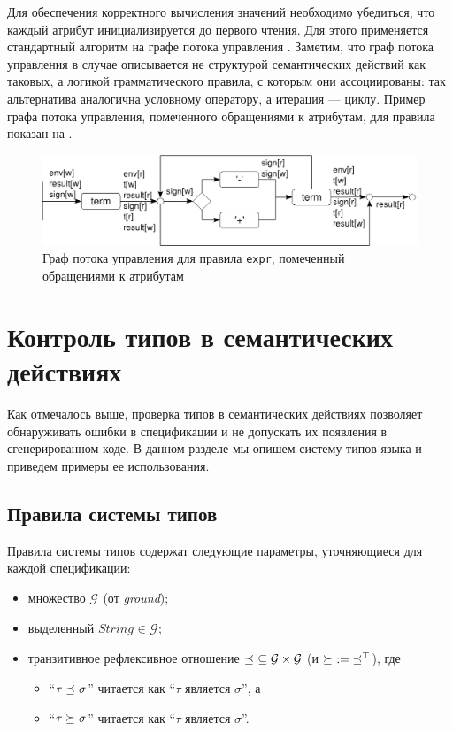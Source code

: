 Для обеспечения корректного вычисления значений необходимо убедиться, что каждый атрибут инициализируется до первого чтения. Для этого применяется стандартный алгоритм на графе потока управления \cite{???}. 
Заметим, что граф потока управления в случае \ATF{} описывается не структурой семантических действий как таковых, а логикой грамматического правила, с которым они ассоциированы: так альтернатива аналогична условному оператору, а итерация --- циклу. Пример графа потока управления, помеченного обращениями к атрибутам, для правила  показан на .
\begin{figure}[htbp]
	\centering
	\includegraphics[width=\textwidth]{cfg.pdf}
	\caption{Граф потока управления для правила \texttt{expr}, помеченный обращениями к атрибутам}\label{cfg}
\end{figure}

\chapter{Контроль типов в семантических действиях}

Как отмечалось выше, проверка типов в семантических действиях позволяет обнаруживать ошибки в спецификации и не допускать их появления в сгенерированном коде. В данном разделе мы опишем систему типов языка \ATF{} и приведем примеры ее использования.

\section{Правила системы типов}

\renewcommand{\L}{{}}
\newcommand{\G}{ {\mathcal{G}_\L} }
\newcommand{\eql}{\cong_\L}
\newcommand{\lel}{\subtype_\L}
\newcommand{\gel}{\suptype_\L}
\newcommand{\TUP}{TupleType}
\newcommand{\Str}{String_\L}

Правила системы типов \ATF{} содержат следующие параметры, уточняющиеся для каждой спецификации:
\begin{itemize}
\item множество  $\G$ (от \emph{ground});
\item выделенный  $\Str \in \G$;
\item транзитивное рефлексивное отношение $\lel \;\subseteq \G \times \G$ (и $\gel \;:=\; \lel^{\top}$), где 
	\begin{itemize}
	\item ``$\tau \lel \sigma$''
читается как ``$\tau$ является  $\sigma$'', а
	\item ``$\tau \gel \sigma$''
читается как ``$\tau$ является  $\sigma$''.
	\end{itemize}
\end{itemize}

